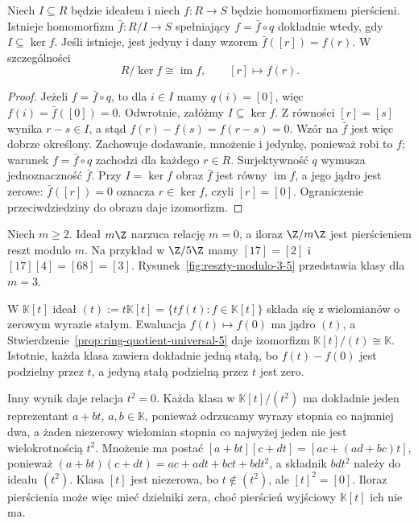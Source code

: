 \begin{stwierdzenie}
\label{prop:ring-quotient-universal-5}
Niech $I\subseteq R$ będzie ideałem i niech
$f:R\to S$ będzie homomorfizmem pierścieni.
Istnieje homomorfizm $\bar f:R/I\to S$ spełniający
$f=\bar f\circ q$ dokładnie wtedy, gdy $I\subseteq\ker f$.
Jeśli istnieje, jest jedyny i dany wzorem $\bar f([r])=f(r)$.
W szczególności
\[
 R/\ker f\cong\operatorname{im}f,
 \qquad [r]\longmapsto f(r).
\]
\end{stwierdzenie}
\begin{proof}
Jeżeli $f=\bar f\circ q$, to dla $i\in I$ mamy
$q(i)=[0]$, więc $f(i)=\bar f([0])=0$.
Odwrotnie, załóżmy $I\subseteq\ker f$. Z równości
$[r]=[s]$ wynika $r-s\in I$, a stąd
$f(r)-f(s)=f(r-s)=0$. Wzór na $\bar f$ jest więc
dobrze określony. Zachowuje dodawanie, mnożenie i jedynkę,
ponieważ robi to $f$; warunek $f=\bar f\circ q$ zachodzi
dla każdego $r\in R$. Surjektywność $q$ wymusza
jednoznaczność $\bar f$. Przy $I=\ker f$ obraz $\bar f$
jest równy $\operatorname{im}f$, a jego jądro jest zerowe:
$\bar f([r])=0$ oznacza $r\in\ker f$, czyli $[r]=[0]$.
Ograniczenie przeciwdziedziny do obrazu daje izomorfizm.
\end{proof}

\begin{przyklad}
\label{prz:idealy-ilorazy}
Niech $m\geq2$. Ideał $m\Z$ narzuca
relację $m=0$, a iloraz $\Z/m\Z$ jest pierścieniem
reszt modulo $m$. Na przykład w $\Z/5\Z$ mamy
$[17]=[2]$ i $[17][4]=[68]=[3]$.
Rysunek~\ref{fig:reszty-modulo-3-5} przedstawia
klasy dla $m=3$.

W $\mathbb K[t]$
ideał $(t):=t\mathbb K[t]=
\{tf(t):f\in\mathbb K[t]\}$ składa się z wielomianów
o zerowym wyrazie stałym. Ewaluacja
$f(t)\mapsto f(0)$ ma jądro $(t)$,
a Stwierdzenie~\ref{prop:ring-quotient-universal-5} daje izomorfizm
$\mathbb K[t]/(t)\cong\mathbb K$.
Istotnie, każda klasa zawiera dokładnie
jedną stałą, bo $f(t)-f(0)$ jest podzielny
przez $t$, a jedyną stałą podzielną przez $t$ jest zero.

Inny wynik daje relacja $t^2=0$.
Każda klasa w $\mathbb K[t]/(t^2)$ ma dokładnie
jeden reprezentant $a+bt$, $a,b\in\mathbb K$,
ponieważ odrzucamy wyrazy stopnia co najmniej dwa,
a żaden niezerowy wielomian stopnia co najwyżej jeden
nie jest wielokrotnością $t^2$.
Mnożenie ma postać
$[a+bt][c+dt]=[ac+(ad+bc)t]$, ponieważ
$(a+bt)(c+dt)=ac+adt+bct+bdt^2$,
a składnik $bdt^2$ należy do ideału $(t^2)$.
Klasa $[t]$ jest niezerowa, bo $t\notin(t^2)$,
ale $[t]^2=[0]$.
Iloraz pierścienia może więc mieć dzielniki zera,
choć pierścień wyjściowy $\mathbb K[t]$ ich nie ma.
\end{przyklad}

